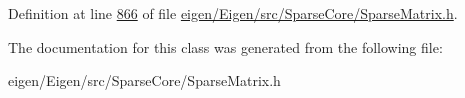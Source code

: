 Definition at line \hyperlink{eigen_2_eigen_2src_2_sparse_core_2_sparse_matrix_8h_source_l00866}{866} of file \hyperlink{eigen_2_eigen_2src_2_sparse_core_2_sparse_matrix_8h_source}{eigen/\+Eigen/src/\+Sparse\+Core/\+Sparse\+Matrix.\+h}.



The documentation for this class was generated from the following file\+:\begin{DoxyCompactItemize}
\item 
eigen/\+Eigen/src/\+Sparse\+Core/\+Sparse\+Matrix.\+h\end{DoxyCompactItemize}
